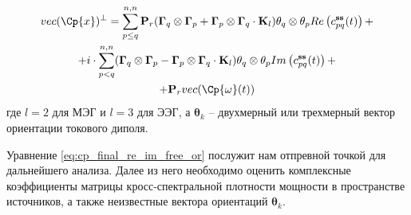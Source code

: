 \begin{multline}
    vec(\Cp{x})^\perp = \sum\limits_{p\leq q}^{n,n}
    \mathbf{P}_r(\mathbf{\Gamma}_q\otimes \mathbf{\Gamma}_p +
                 \mathbf{\Gamma}_p\otimes \mathbf{\Gamma}_q\cdot \mathbf{K}_l)
                 \mathbf{\theta}_q \otimes \mathbf{\theta}_p
           Re\left(c_{pq}^{\mathbf{ss}}(t)\right) + \\
       +    i \cdot \sum\limits_{p<q}^{n,n}
           (\mathbf{\Gamma}_q\otimes \mathbf{\Gamma}_p -
            \mathbf{\Gamma}_p\otimes \mathbf{\Gamma}_q\cdot \mathbf{K}_l)
            \mathbf{\theta}_q \otimes \mathbf{\theta}_p
           Im\left(c_{pq}^{\mathbf{ss}}(t)\right) + \\
       +   \mathbf{P}_r vec(\Cp{\omega}(t))
    \label{eq:cp_final_re_im_free_or}
\end{multline}
где $l=2$ для МЭГ и $l=3$ для ЭЭГ, а $\mathbf{\theta}_k$ -- двухмерный или трехмерный вектор ориентации токового диполя.

Уравнение \ref{eq:cp_final_re_im_free_or} послужит нам отпревной точкой для дальнейшего анализа.
Далее из него необходимо оценить комплексные коэффициенты матрицы кросс-спектральной плотности мощности в
пространстве источников, а также неизвестные вектора ориентаций $\mathbf{\theta}_k$.

